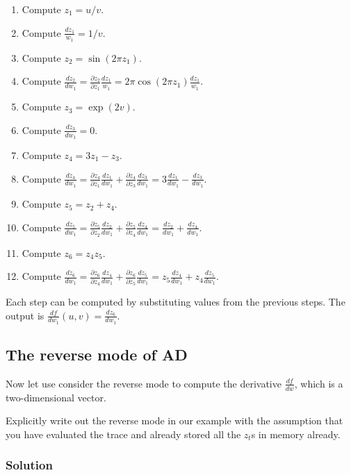 \documentclass[letterpaper,11pt]{article}
\begin{document}
\begin{enumerate}
\item Compute $z_1 = u/v$.
\item Compute $\frac{dz_1}{w_1} = 1/v$.
\item Compute $z_2 = \sin\left(2\pi z_1\right)$.
\item Compute
  $\displaystyle\frac{dz_2}{dw_1} = \frac{\partial z_2}{\partial
    z_1}\frac{dz_1}{w_1} = 2\pi\cos\left(2\pi z_1\right)\frac{dz_1}{w_1}$.
\item Compute $z_3 = \exp\left(2v\right)$.
\item Compute $\displaystyle \frac{dz_3}{dw_1} = 0$.
\item Compute $z_4 = 3z_1 - z_3$.
\item Compute
  $\displaystyle \frac{dz_4}{dw_1}= \frac{\partial z_4}{\partial z_1}\frac{dz_1}{dw_1} + \frac{\partial z_4}{\partial z_3}\frac{dz_3}{dw_1} = 3\frac{dz_1}{dw_1} - \frac{dz_3}{dw_1}$.
\item Compute $z_5 = z_2 + z_4$.
\item Compute $\displaystyle \frac{dz_5}{dw_1} = \frac{\partial z_5}{\partial z_2}\frac{dz_2}{dw_1} + \frac{\partial z_5}{\partial z_4}\frac{dz_4}{dw_1} = \frac{dz_2}{dw_1} + \frac{dz_4}{dw_1}$.
\item Compute $z_6 = z_4z_5$.
\item Compute $\displaystyle\frac{dz_6}{dw_1} = \frac{\partial z_6}{\partial z_4}\frac{dz_4}{dw_1} + \frac{\partial z_6}{\partial z_5}\frac{dz_5}{dw_1} = z_5\frac{dz_4}{dw_1} + z_4\frac{dz_5}{dw_1}$.
\end{enumerate}

Each step can be computed by substituting values from the previous steps. The
output is $\displaystyle\boxed{\frac{df}{dw_1}(u,v) = \frac{dz_6}{dw_1}.}$

\subsection*{The reverse mode of AD}

Now let use consider the reverse mode to compute the derivative
$\frac{df}{dw}$, which is a two-dimensional vector.

Explicitly write out the reverse mode in our example with the assumption that
you have evaluated the trace and already stored all the $z_t$s in memory
already.

\subsubsection*{Solution}
\end{document}

